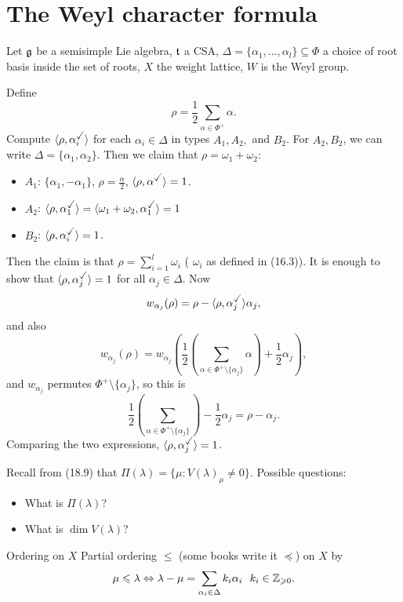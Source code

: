 \documentclass{article}
\begin{document}
\section{The Weyl character formula}
Let $\mathfrak{g}$ be a semisimple Lie algebra, $\mathfrak{t}$ a CSA, $\Delta = \{\alpha_{1}, \dots, \alpha_{l}\} \subseteq \Phi$ a choice of root basis inside the set of roots, $X$ the weight lattice, $W$ is the Weyl group.
\begin{ex*}
    Define \[ \rho = \frac{1}{2} \sum_{\alpha \in \Phi^{+}} \alpha.\] Compute $\langle \rho, \alpha_{i}^{\checked} \rangle$ for each $\alpha_{i} \in \Delta$ in types $A_{1}, A_{2},$ and $B_{2}$. For $A_{2}, B_{2}$, we can write $\Delta = \{ \alpha_{1}, \alpha_{2} \}$. Then we claim that $\rho = \omega_{1} + \omega_{2}$: \begin{itemize}
        \item $A_{1}$: $\{\alpha_{1}, -\alpha_{1}\}$, $\rho = \frac{\alpha}{2}$, $\langle \rho, \alpha^{\checked} \rangle = 1$.
        \item $A_{2}$: $\langle \rho, \alpha_{1}^{\checked} \rangle = \langle \omega_{1} + \omega_{2}, \alpha_{1}^{\checked} \rangle = 1$
        \item $B_{2}$: $\langle \rho, \alpha_{i}^{\checked} \rangle = 1$.
    \end{itemize}
    Then the claim is that $\rho = \sum_{i=1}^{l}\omega_{i}$ ( $\omega_{i}$ as defined in (16.3)). \gap 
    It is enough to show that $\langle \rho, \alpha_{j}^{\checked} \rangle  = 1$ for all $\alpha_{j} \in \Delta$. Now \[ w_{\alpha_{j}}(\rho) = \rho - \langle \rho, \alpha_{j}^{\checked} \rangle \alpha_{j},\] and also \[ w_{\alpha_{j}}(\rho) = w_{\alpha_{j}}\left( \frac{1}{2} \left( \sum_{\alpha \in \Phi^{+}\setminus \{\alpha_{j} \}} \alpha \right) + \frac{1}{2}\alpha_{j}\right),\]
    and $w_{\alpha_{j}}$ permutes $\Phi^{+}\setminus \{ \alpha_{j} \}$, so this is \[ \frac{1}{2} \left( \sum_{\alpha \in \Phi^{+} \setminus \{ \alpha_{j} \} } \right) - \frac{1}{2}\alpha_{j} = \rho - \alpha_{j}.\]
    Comparing the two expressions, $\langle \rho , \alpha_{j}^{\checked} \rangle = 1$. 
\end{ex*}
Recall from (18.9) that $\Pi(\lambda) = \{ \mu : V(\lambda)_{\mu} \neq 0 \}$. Possible questions: \begin{itemize}
    \item What is $\Pi(\lambda)$?
    \item What is $\dim V(\lambda)$?
\end{itemize} 
\begin{fancydefine}{Ordering on $X$}
    Partial ordering $\leq$ (some books write it $\preceq$) on $X$ by \[ \mu \leqslant \lambda \Leftrightarrow \lambda - \mu = \sum_{\alpha_{i} \in \Delta} k_{i} \alpha_{i} \,\,\,\, k_{i} \in \mathbb{Z}_{\geqslant 0}.\]
\end{fancydefine}
\end{document}
